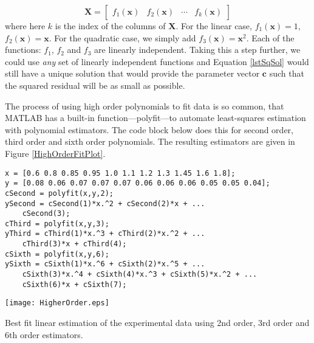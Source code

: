 \begin{equation}
\mathbf{X} = 
\left[
\begin{matrix}
f_{1}(\mathbf{x}) & f_{2}(\mathbf{x}) & \cdots & f_{k}(\mathbf{x})
\end{matrix}
\right]
\end{equation}  
where here $k$ is the index of the columns of $\mathbf{X}$.  For the linear case, $f_{1}(\mathbf{x}) = 1$, $f_{2}(\mathbf{x}) = \mathbf{x}$.  For the quadratic case, we simply add $f_{3}(\mathbf{x}) = \mathbf{x}^{2}$.  Each of the functions: $f_{1}$, $f_{2}$ and $f_{3}$ are linearly independent. Taking this a step further, we could use \emph{any} set of linearly independent functions and Equation \ref{lstSqSol} would still have a unique solution that would provide the parameter vector $\mathbf{c}$ such that the squared residual will be as small
as possible.

The process of using high order polynomials to fit data is so common, that MATLAB has a built-in function---polyfit---to automate least-squares estimation with polynomial estimators.  The code block below does this for second order, third order and sixth order polynomials.  The resulting estimators are given in Figure \ref{HighOrderFitPlot}.  

\begin{lstlisting}[style=myMatlab]
x = [0.6 0.8 0.85 0.95 1.0 1.1 1.2 1.3 1.45 1.6 1.8]; 
y = [0.08 0.06 0.07 0.07 0.07 0.06 0.06 0.06 0.05 0.05 0.04]; 
cSecond = polyfit(x,y,2); 
ySecond = cSecond(1)*x.^2 + cSecond(2)*x + ...
    cSecond(3);
cThird = polyfit(x,y,3);
yThird = cThird(1)*x.^3 + cThird(2)*x.^2 + ...
    cThird(3)*x + cThird(4);
cSixth = polyfit(x,y,6);
ySixth = cSixth(1)*x.^6 + cSixth(2)*x.^5 + ...
    cSixth(3)*x.^4 + cSixth(4)*x.^3 + cSixth(5)*x.^2 + ...
    cSixth(6)*x + cSixth(7);
\end{lstlisting}


\begin{marginfigure}[-5.5cm]
\texttt{[image: HigherOrder.eps]}
\caption{Best fit linear estimation of the experimental data using 2nd order,
  3rd order and 6th order estimators.}
\label{HighOrderFitPlot}
\end{marginfigure}  

